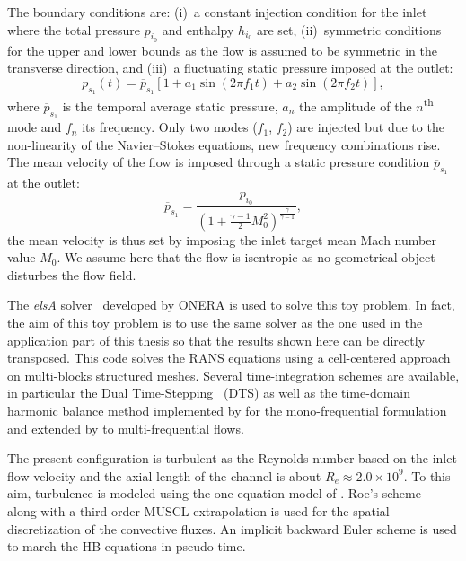 The boundary conditions are: (i)~a constant injection condition for the inlet
where the total pressure $p_{i_0}$ and enthalpy $h_{i_0}$ are set,
(ii)~symmetric conditions for the upper and lower bounds as the flow
is assumed to be symmetric in the transverse direction, and (iii)~a
fluctuating static pressure imposed at the outlet:
\begin{equation}
  p_{s_1}(t) = \overline{p}_{s_1} \left[1 + a_1 \sin(2 \pi f_1 t) +
    a_2 \sin(2 \pi f_2 t) \right],
  \label{eq:outlet_canal}
\end{equation}
where $\overline{p}_{s_1}$ is the temporal average static pressure, $a_n$ the
amplitude of the $n$\textsuperscript{th} mode and $f_n$ its
frequency. Only two modes ($f_1$, $f_2$) are injected
but due to the non-linearity of the Navier--Stokes equations,
new frequency combinations rise.
The mean velocity of the flow is imposed through a
static pressure condition $\overline{p}_{s_1}$ at the outlet:
\begin{equation}
    \overline{p}_{s_1} = \frac{p_{i_0}}{\left(1 + 
    \frac{\gamma - 1}{2} M_{0}^2 \right) ^ {\frac{\gamma}{ \gamma - 1}}} ,
\end{equation}
the mean velocity is thus set by imposing the
inlet target mean Mach number value $M_{0}$.
We assume here that the flow is isentropic as no
geometrical object disturbes the flow field.

The \emph{elsA} solver~\cite{Cambier2013} developed by ONERA
is used to solve this toy problem. In fact, 
the aim of this toy problem is 
to use the same
solver as the one used in the application part of this
thesis so that the results shown here can be directly
transposed. 
This code solves the RANS equations using a cell-centered
approach on multi-blocks structured meshes.
Several time-integration schemes
are available, in particular the Dual Time-Stepping~\cite{Jameson1981} (DTS)
as well as the time-domain harmonic 
balance method implemented by \citet{JSicot2008} for the mono-frequential
formulation and extended by \citet{JGuedeney2013} to multi-frequential flows. 


The present configuration is turbulent as the Reynolds number based on the
inlet flow velocity and the axial length of the channel is about $R_e
\approx 2.0 \times 10^9$. To this aim, turbulence is modeled using the
one-equation model of \citet{Spalart1992}.
Roe's scheme~\cite{Roe1981} along with a third-order MUSCL extrapolation 
is used for the spatial discretization of
the convective fluxes. An implicit backward Euler scheme is used
to march the HB equations in pseudo-time.

